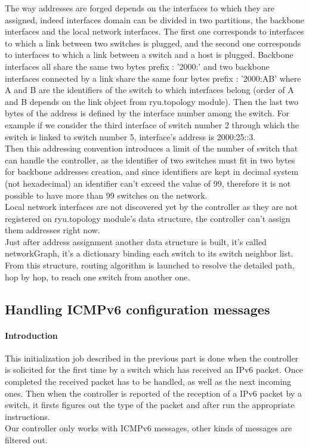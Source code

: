 \documentclass{article}
\begin{document}
The way addresses are forged depends on the interfaces to which they
are assigned, indeed interfaces domain can be divided in two
partitions, the backbone interfaces and the local network
interfaces. The first one corresponds to interfaces to which a link
between two switches is plugged, and the second one corresponds to
interfaces to which a link between a switch and a host is
plugged. Backbone interfaces all share the same two bytes prefix :
'2000:' and two backbone interfaces connected by a link share the same
four bytes prefix : '2000:AB' where A and B are the identifiers of the
switch to which interfaces belong (order of A and B depends on the
link object from ryu.topology module). Then the last two bytes of the
address is defined by the interface number among the switch. For
example if we consider the third interface of switch number 2 through
which the switch is linked to switch number 5, interface's address is
2000:25::3.\\
\newline
Then this addressing convention introduces a limit of the number of
switch that can handle the controller, as the identifier of two
switches must fit in two bytes for backbone addresses creation, and
since identifiers are kept in decimal system (not hexadecimal) an
identifier can't exceed the value of 99, therefore it is not possible
to have more than 99 switches on the network.\\
\newline
Local network interfaces are not discovered yet by the controller
as they are not registered on ryu.topology module's data structure,
the controller can't assign them addresses right now.\\
\newline
Just after address assignment another data structure is built, it's
called networkGraph, it's a dictionary binding each switch to its
switch neighbor list. From this structure, routing algorithm is
launched to resolve the detailed path, hop by hop, to reach one switch
from another one.\\

\subsection{Handling ICMPv6 configuration messages}

\paragraph{Introduction}
This initialization job described in the previous part is done when
the controller is solicited for the first time by a switch which has
received an IPv6 packet. Once completed the received packet has to be
handled, as well as the next incoming ones. Then when the controller
is reported of the reception of a IPv6 packet by a switch, it firsts
figures out the type of the packet and after run the appropriate
instructions.\\
Our controller only works with ICMPv6 messages, other kinds of
messages are filtered out.
\end{document}
